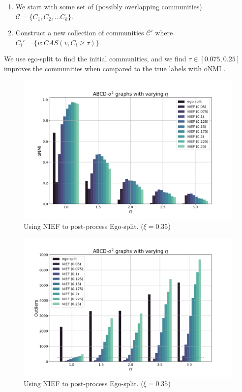 \documentclass{beamer}
\begin{document}
\begin{frame}{}
    \begin{enumerate}
        \color{darkblue}
        \item We start with some set of (possibly overlapping communities) $\mathcal{C} = \{C_1, C_2, \dots C_k\}$.
        \item Construct a new collection of communities $\mathcal{C}'$ where $C_i' = \{v: CAS(v, C_i \geq \tau)\}$.
    \end{enumerate}
    We use ego-split \citep{egosplit} to find the initial communities, and we find $\tau \in [0.075,0.25]$ improves the communities when compared to the true labels with oNMI \citep{onmi}.
\end{frame}
\begin{frame}{}
    \begin{figure}
        \vspace{-1em}
        \includegraphics[height=0.8\textheight]{figures/ego_1.png}
        \caption{Using NIEF to post-process Ego-split. ($\xi = 0.35$)}
    \end{figure}
\end{frame}
\begin{frame}{}
    \begin{figure}
        \vspace{-1em}
        \includegraphics[height=0.8\textheight]{figures/ego_2.png}
        \caption{Using NIEF to post-process Ego-split. ($\xi=0.35$)}
    \end{figure}
\end{frame}
\end{document}
